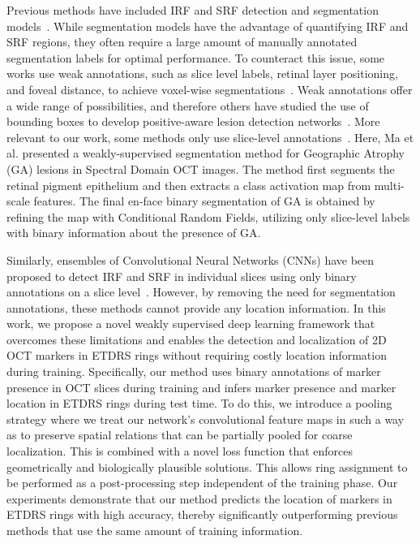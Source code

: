 Previous methods have included IRF and SRF detection and segmentation models~. While segmentation models have the advantage of quantifying IRF and SRF regions, they often require a large amount of manually annotated segmentation labels for optimal performance. To counteract this issue, some works use weak annotations, such as slice level labels, retinal layer positioning, and foveal distance, to achieve voxel-wise segmentations~. Weak annotations offer a wide range of possibilities, and therefore others have studied the use of bounding boxes to develop positive-aware lesion detection networks~. More relevant to our work, some methods only use slice-level annotations~. Here, Ma et al. presented a weakly-supervised segmentation method for Geographic Atrophy (GA) lesions in Spectral Domain OCT images.  The method first segments the retinal pigment epithelium and then extracts a class activation map from multi-scale features. The final en-face binary segmentation of GA is obtained by refining the map with Conditional Random Fields, utilizing only slice-level labels with binary information about the presence of GA.


Similarly, ensembles of Convolutional Neural Networks (CNNs) have been proposed to detect IRF and SRF in individual slices using only binary annotations on a slice level~. However, by removing the need for segmentation annotations, these methods cannot provide any location information.  In this work, we propose a novel weakly supervised deep learning framework that overcomes these limitations and enables the detection and localization of 2D OCT markers in ETDRS rings without requiring costly location information during training. Specifically, our method uses binary annotations of marker presence in OCT slices during training and infers marker presence and marker location in ETDRS rings during test time. To do this, we introduce a pooling strategy where we treat our network's convolutional feature maps in such a way as to preserve spatial relations that can be partially pooled for coarse localization. This is combined with a novel loss function that enforces geometrically and biologically plausible solutions. This allows ring assignment to be performed as a post-processing step independent of the training phase. Our experiments demonstrate that our method predicts the location of markers in ETDRS rings with high accuracy, thereby significantly outperforming previous methods that use the same amount of training information. 